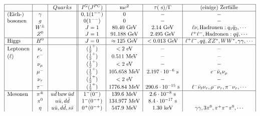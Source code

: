 
\newcommand {\1}{\protect\raisebox{-1.4ex}[1.0ex][0ex]{"}}
\newcommand{\kev}{~\textrm{keV}}
\newcommand{\mev}{~\textrm{MeV}}
\newcommand{\gev}{~\textrm{GeV}}
\newcommand{\ev} {~\textrm{eV}}
\newcommand{\half}{\frac{1}{2}}



\begin{center}
\hspace*{3cm}{\small Einige Elementarteilchen und deren Eigenschaften} 
\end{center}
\scriptsize
$$
\begin{array}{|l|c|c||c|c|c|c|c|c|c|}\hline
 & &Quarks&  I^G(J^{PC}) & {\textrm{m}c}^2 &\tau (~\textrm{s})/\Gamma&{\textrm{(einige)}~ \mbox{\textrm{Zerfälle}}} \\ \hline
{(\textrm{Eich-})} & \gamma & & 0,1(1^{--}) & 0 & - & - \\
{\textrm{bosonen}} & g & & 0(1^{--}) & 0 & - & - \\
& W^\pm & & J=1 & 80.40\gev & 2.14\gev & \ell\nu, \textrm{Hadronen}: q_1\bar{q}_2, \cdots\\
 & Z ^0 & &  J=1 &91.188\gev & 2.495\gev & \ell^+\ell^-, \textrm{Hadronen}: q\bar{q}, \cdots  \\\hline
\textrm{Higgs}  &H^0& & J=0 &\approx 125\gev  &<0.013\gev&  \ell^+\ell^-, q\bar{q}, ZZ^*,WW^*, \gamma\gamma, \cdots \\\hline
\textrm{Leptonen}  &  \nu_e &&  (\half^+)  & <2\ev & -  & -\\
 (\ell)& e^- & &(\half^+) & 0.511\mev & - & - \\
& \nu_\mu & & (\half^+)  & <2\ev & - & -  \\
& \mu^- & & (\half^+) & 105.658\mev & 2.197\cdot10^{-6}~\textrm{s} & e^-\bar{\nu}_e\nu_\mu\\
& \nu_\tau & &  (\half^+) & <2\ev & - & - \\
& \tau^- & &(\half^+)&1776.84\mev & 290.6\cdot10^{-15}~\textrm{s} & \ell^-\bar{\nu}_\ell\nu_\tau, \rho^-\nu_\tau, \pi^-\nu_\tau,\cdots \\ \hline
\textrm{Mesonen}&  \pi^\pm & u\bar{d}\, \textrm{bzw}\,\bar{u}d & 1^-(0^-) & 139.6\mev  & 2.6\cdot10^{-8}~\textrm{s} & \\%
& \pi^0 & u\bar{u},d\bar{d} & 1^-(0^{-+}) & 134.977\mev & 8.4\cdot10^{-17}~\textrm{s} & \\%
& \eta & u\bar{u},d\bar{d},s\bar{s} & 0^+(0^{-+}) & 547.9\mev & 1.30\kev & \gamma\gamma, 3\pi^0, \pi^+\pi^-\pi^0,\cdots \\

\end{array}$$
